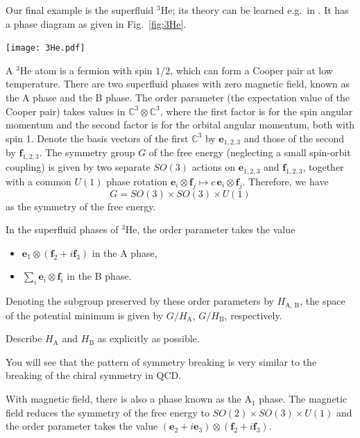 \documentclass[12pt]{article}
\numberwithin{equation}{section}
\renewenvironment{figure}[1][]{
  \begin{originalfigure}[#1]
    \begin{mdframed}[linecolor=black!0,backgroundcolor=black!1]
}{
    \end{mdframed}
  \end{originalfigure}
}
\def\bC{\mathbb{C}}
\begin{document}
Our final example is the superfluid $^3$He;
its theory can be learned e.g.~in \cite{SuperfluidHe3Textbook,VolovikBook}.
It has a phase diagram as given in Fig.~\ref{fig:3He}.
\begin{figure}[h]
\centering
    \texttt{[image: 3He.pdf]}
    \caption{Phase diagram of $^3$He (taken from \cite[Fig.7.1]{VolovikBook}).}
    \label{fig:3He}
\end{figure}
A $^3$He atom is a fermion with spin $1/2$, which can form a Cooper pair at low temperature.
There are two superfluid phases with zero magnetic field, known as the A phase and the B phase.
The order parameter (the expectation value of the Cooper pair) takes values in
$\bC^3\otimes \bC^3$,
where the first factor is for the spin angular momentum
and the second factor is for the orbital angular momentum,
both with spin 1.
Denote the basis vectors of the first $\bC^3$ by $\mathbf{e}_{1,2,3}$
and those of the second by $\mathbf{f}_{1,2,3}$.
The symmetry group $G$ of the free energy (neglecting a small spin-orbit coupling) is given by two separate $SO(3)$ actions on 
$\mathbf{e}_{1,2,3}$ and $\mathbf{f}_{1,2,3}$,
together with a common $U(1)$ phase rotation $\mathbf{e}_i \otimes \mathbf{f}_j \mapsto c\, \mathbf{e}_i \otimes \mathbf{f}_j$.
Therefore, we have \begin{equation}
  G = SO(3)\times SO(3)\times U(1)
\end{equation}
as the symmetry of the free energy.
\begin{example}
\label{ex:helium3}
In the superfluid phases of $^3$He, the order parameter takes the value
\begin{itemize}
\item $\mathbf{e}_1 \otimes (\mathbf{f}_2+ i\mathbf{f}_3)$ in the A phase,
\item $\sum_i \mathbf{e}_i \otimes \mathbf{f}_i$ in the B phase.
\end{itemize}
Denoting the subgroup preserved by these order parameters by $H_\text{A,  B}$,
the space of the potential minimum is given by $G/H_\text{A}$, $G/H_\text{B}$, respectively.
\end{example}

\begin{question}
Describe $H_\text{A}$ and $H_\text{B}$ as explicitly as possible.
\end{question}
You will see that the pattern of symmetry breaking is very similar to the 
breaking of the chiral symmetry in QCD.

With magnetic field, there is also a phase known as the A$_1$ phase.
The magnetic field reduces the symmetry of the free energy
to $SO(2)\times SO(3)\times U(1)$
and the order parameter takes the value 
 $(\mathbf{e}_2+i\mathbf{e}_3) \otimes (\mathbf{f}_2+ i\mathbf{f}_3)$.
\end{document}
